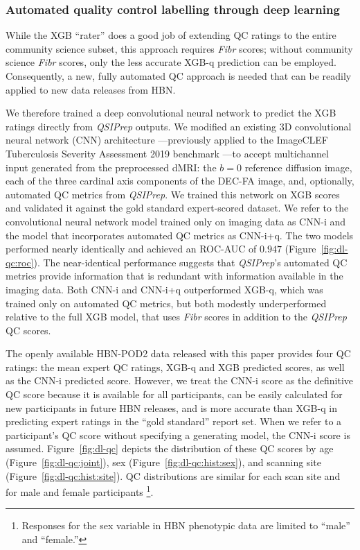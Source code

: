 \documentclass[9pt,lineno]{elife}
\begin{document}
\subsubsection{Automated quality control labelling through deep learning}

While the XGB ``rater'' does a good job of extending QC ratings to the entire
community science subset, this approach requires \emph{Fibr} scores; without community
science \emph{Fibr} scores, only the less accurate XGB-q
prediction can be employed. Consequently, a new, fully automated QC approach is needed that can be readily applied to new data releases from HBN.

We therefore trained a deep convolutional neural network to predict the XGB
ratings directly from \emph{QSIPrep} outputs. We modified an existing 3D
convolutional neural network (CNN) architecture \citep{zunair2020-bs}---previously
applied to the ImageCLEF Tuberculosis Severity Assessment 2019 benchmark
\citep{dicente2019clef}---to accept multichannel input generated from the
preprocessed dMRI: the $b=0$ reference diffusion image, each of the three
cardinal axis components of the DEC-FA image, and, optionally, automated QC
metrics from \emph{QSIPrep}. We trained this network on XGB scores and validated it
against the gold standard expert-scored dataset. We refer to the convolutional
neural network model trained only on imaging data as CNN-i and the model that
incorporates automated QC metrics as CNN-i+q. The two models performed nearly
identically and achieved an ROC-AUC of $0.947$ (Figure~\ref{fig:dl-qc:roc}). The
near-identical performance suggests that \emph{QSIPrep}'s automated QC metrics
provide information that is redundant with information available in the imaging
data. Both CNN-i and CNN-i+q outperformed XGB-q, which was trained only on
automated QC metrics, but both modestly underperformed relative to the full XGB model,
that uses \emph{Fibr} scores in addition to the \emph{QSIPrep} QC scores.

The openly available HBN-POD2 data released with this paper provides four QC ratings: the mean expert QC ratings, XGB-q and
XGB predicted scores, as well as the CNN-i predicted score. However, we treat the CNN-i
score as the definitive QC score because it is available for all participants,
can be easily calculated for new participants in future HBN releases, and is more
accurate than XGB-q in predicting expert ratings in the ``gold standard'' report set. When we refer to a participant's QC score without
specifying a generating model, the CNN-i score is assumed.
Figure~\ref{fig:dl-qc} depicts the distribution of these QC scores by age
(Figure~\ref{fig:dl-qc:joint}), sex (Figure~\ref{fig:dl-qc:hist:sex}), and scanning site
(Figure~\ref{fig:dl-qc:hist:site}). QC distributions are similar for each scan site
and for male and female participants \footnote{%
    Responses for the sex variable in HBN phenotypic data are limited to
    ``male'' and ``female.''
}.
\end{document}
